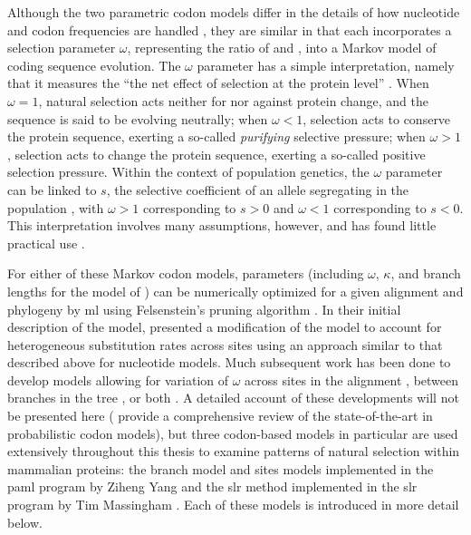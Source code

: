 Although the two parametric codon models differ in the details of how
nucleotide and codon frequencies are handled
\citep{Yang2000c,Bierne2003a}, they are similar in that each
incorporates a selection parameter $\omega$, representing the ratio of
\dn and \ds, into a Markov model of coding sequence evolution. The
$\omega$ parameter has a simple interpretation, namely that it
measures the ``the net effect of selection at the protein level''
\citep{Yang2000CodonSubstitution}. When $\omega=1$, natural selection
acts neither for nor against protein change, and the sequence is said
to be evolving neutrally; when $\omega<1$, selection acts to conserve
the protein sequence, exerting a so-called \emph{purifying} selective
pressure; when $\omega>1$, selection acts to change the protein
sequence, exerting a so-called positive selection pressure. Within the
context of population genetics, the $\omega$ parameter can be linked
to $s$, the selective coefficient of an allele segregating in the
population \citep{Nielsen2003,Nielsen2005b,Kryazhimskiy2008}, with
$\omega>1$ corresponding to $s>0$ and $\omega<1$ corresponding to
$s<0$. This interpretation involves many assumptions, however, and has
found little practical use \citep{Nielsen2003,Nielsen2005b}.

For either of these Markov codon models, parameters (including
$\omega$, $\kappa$, and branch lengths for the model of
\citet{Goldman1994a}) can be numerically optimized for a given
alignment and phylogeny by \ac{ml} using Felsenstein's pruning
algorithm \citep{Felsenstein1981a,Goldman1994a,Yang2000c}. In their
initial description of the model, \citet{Goldman1994a} presented a
modification of the model to account for heterogeneous substitution
rates across sites using an approach similar to that described above
for nucleotide models. Much subsequent work has been done to develop
models allowing for variation of $\omega$ across sites in the
alignment \citep{Nielsen1998,Yang2000CodonSubstitution,Yang2002,
  Wong2004,Yang2005Bayes,Massingham2005}, between branches in the tree
\citep{Yang1998a}, or both \citep{Yang2002b,Zhang2005}.  A detailed
account of these developments will not be presented here
(\citet{Anisimova2009} provide a comprehensive review of the
state-of-the-art in probabilistic codon models), but three codon-based
models in particular are used extensively throughout this thesis to
examine patterns of natural selection within mammalian proteins: the
branch model and sites models implemented in the \ac{paml} program by
Ziheng Yang \citep{Yang2007PAML} and the \ac{slr} method implemented in
the \ac{slr} program by Tim Massingham \citep{Massingham2005}. Each of
these models is introduced in more detail below.

